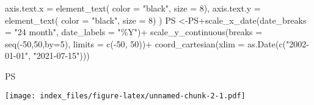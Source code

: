 \documentclass[
]{book}
\newenvironment{Shaded}{\begin{snugshade}}{\end{snugshade}}
\newcommand{\AttributeTok}[1]{\textcolor[rgb]{0.77,0.63,0.00}{#1}}
\newcommand{\DecValTok}[1]{\textcolor[rgb]{0.00,0.00,0.81}{#1}}
\newcommand{\FunctionTok}[1]{\textcolor[rgb]{0.00,0.00,0.00}{#1}}
\newcommand{\NormalTok}[1]{#1}
\newcommand{\OtherTok}[1]{\textcolor[rgb]{0.56,0.35,0.01}{#1}}
\newcommand{\SpecialCharTok}[1]{\textcolor[rgb]{0.00,0.00,0.00}{#1}}
\newcommand{\StringTok}[1]{\textcolor[rgb]{0.31,0.60,0.02}{#1}}
\begin{document}
\begin{Shaded}
\begin{Highlighting}[]
  \AttributeTok{axis.text.x =} \FunctionTok{element\_text}\NormalTok{( }\AttributeTok{color =} \StringTok{"black"}\NormalTok{, }\AttributeTok{size =} \DecValTok{8}\NormalTok{),}
  \AttributeTok{axis.text.y =} \FunctionTok{element\_text}\NormalTok{( }\AttributeTok{color =} \StringTok{"black"}\NormalTok{, }\AttributeTok{size =} \DecValTok{8}\NormalTok{)}
\NormalTok{)}
\NormalTok{PS }\OtherTok{\textless{}{-}}\NormalTok{PS}\SpecialCharTok{+}\FunctionTok{scale\_x\_date}\NormalTok{(}\AttributeTok{date\_breaks =} \StringTok{"24 month"}\NormalTok{, }\AttributeTok{date\_labels =} \StringTok{"\%Y"}\NormalTok{)}\SpecialCharTok{+}
  \FunctionTok{scale\_y\_continuous}\NormalTok{(}\AttributeTok{breaks =} \FunctionTok{seq}\NormalTok{(}\SpecialCharTok{{-}}\DecValTok{50}\NormalTok{,}\DecValTok{50}\NormalTok{,}\AttributeTok{by=}\DecValTok{5}\NormalTok{), }\AttributeTok{limits =} \FunctionTok{c}\NormalTok{(}\SpecialCharTok{{-}}\DecValTok{50}\NormalTok{, }\DecValTok{50}\NormalTok{))}\SpecialCharTok{+}
  \FunctionTok{coord\_cartesian}\NormalTok{(}\AttributeTok{xlim =}  \FunctionTok{as.Date}\NormalTok{(}\FunctionTok{c}\NormalTok{(}\StringTok{"2002{-}01{-}01"}\NormalTok{, }\StringTok{"2021{-}07{-}15"}\NormalTok{)))}
\end{Highlighting}
\end{Shaded}

\begin{Shaded}
\begin{Highlighting}[]
\NormalTok{PS}
\end{Highlighting}
\end{Shaded}

\texttt{[image: index\_files/figure-latex/unnamed-chunk-2-1.pdf]}

  
\end{document}
